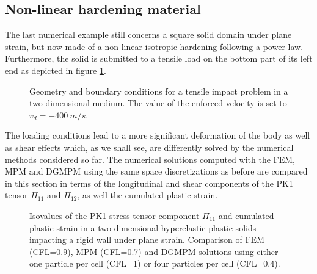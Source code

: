 \subsection{Non-linear hardening material}
\label{sec:non-linear-hardening}
The last numerical example still concerns a square solid domain under plane strain, but now made of a non-linear isotropic hardening following a power law.
Furthermore, the solid is submitted to a tensile load on the bottom part of its left end as depicted in figure \ref{fig:geom_partial_traction}.
\begin{figure}[ht]
  \centering
  
  \caption{Geometry and boundary conditions for a tensile impact problem in a two-dimensional medium. The value of the enforced velocity is set to $v_d=-400 \: m/s$.}
  \label{fig:geom_partial_traction}
\end{figure}
The loading conditions lead to a more significant deformation of the body as well as shear effects which, as we shall see, are differently solved by the numerical methods considered so far.
The numerical solutions computed with the FEM, MPM and DGMPM using the same space discretizations as before are compared in this section in terms of the longitudinal and shear components of the PK1 tensor $\Pi_{11}$ and $\Pi_{12}$, as well the cumulated plastic strain. 

\begin{figure}[ht]
  \centering
  \qquad
  \caption{Isovalues of the PK1 stress tensor component $\Pi_{11}$ and cumulated plastic strain in a two-dimensional hyperelastic-plastic solids impacting a rigid wall under plane strain. Comparison of FEM (CFL=0.9), MPM (CFL=0.7) and DGMPM solutions using either one particle per cell (CFL=1) or four particles per cell (CFL=0.4).}
  \label{fig:PS_taylor_NL}
\end{figure}

%   


